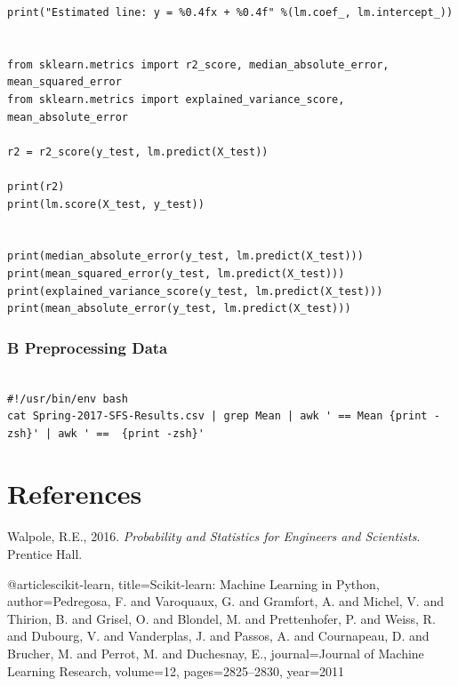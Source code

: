 \documentclass[10pt]{report}
\begin{document}
\begin{lstlisting}
print("Estimated line: y = %0.4fx + %0.4f" %(lm.coef_, lm.intercept_))


from sklearn.metrics import r2_score, median_absolute_error, mean_squared_error
from sklearn.metrics import explained_variance_score, mean_absolute_error

r2 = r2_score(y_test, lm.predict(X_test))

print(r2)
print(lm.score(X_test, y_test))


print(median_absolute_error(y_test, lm.predict(X_test)))
print(mean_squared_error(y_test, lm.predict(X_test)))
print(explained_variance_score(y_test, lm.predict(X_test)))
print(mean_absolute_error(y_test, lm.predict(X_test)))

\end{lstlisting}

\subsubsection*{B Preprocessing Data}

\lstset{language=Bash}
\begin{lstlisting}

#!/usr/bin/env bash
cat Spring-2017-SFS-Results.csv | grep Mean | awk ' == Mean {print -zsh}' | awk ' ==  {print -zsh}'

\end{lstlisting}


\newpage
\section*{References}

Walpole, R.E., 2016. \textit{Probability and Statistics for Engineers and Scientists}. Prentice Hall.
\newline
\newline

@article{scikit-learn,
 title={Scikit-learn: Machine Learning in {P}ython},
 author={Pedregosa, F. and Varoquaux, G. and Gramfort, A. and Michel, V.
         and Thirion, B. and Grisel, O. and Blondel, M. and Prettenhofer, P.
         and Weiss, R. and Dubourg, V. and Vanderplas, J. and Passos, A. and
         Cournapeau, D. and Brucher, M. and Perrot, M. and Duchesnay, E.},
 journal={Journal of Machine Learning Research},
 volume={12},
 pages={2825--2830},
 year={2011}
}
\end{document}
